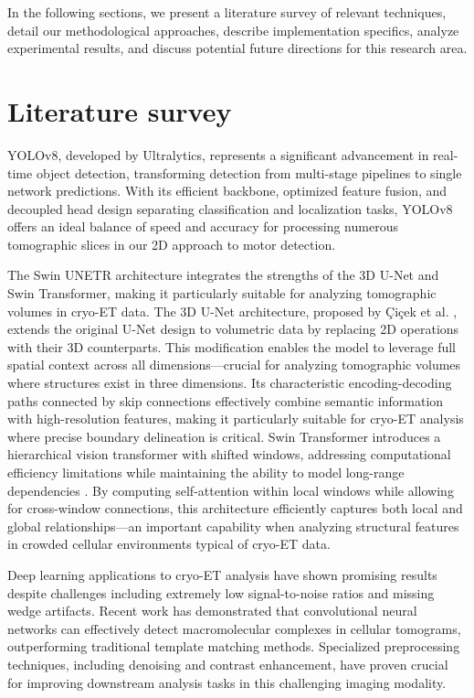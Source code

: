 \documentclass{article}
\begin{document}
In the following sections, we present a literature survey of relevant techniques, detail our methodological approaches, describe implementation specifics, analyze experimental results, and discuss potential future directions for this research area.


\section{Literature survey}
\label{sec:lite}
    YOLOv8, developed by Ultralytics, represents a significant advancement in real-time object detection, transforming detection from multi-stage pipelines to single network predictions\cite{jocherUltralyticsYolov5V702022}. With its efficient backbone, optimized feature fusion, and decoupled head design separating classification and localization tasks, YOLOv8 offers an ideal balance of speed and accuracy for processing numerous tomographic slices in our 2D approach to motor detection\cite{yaseenWhatYOLOv8InDepth2024}.
    
    The Swin UNETR architecture integrates the strengths of the 3D U-Net and Swin Transformer\cite{Hatamizadeh2022SwinUS}, making it particularly suitable for analyzing tomographic volumes in cryo-ET data. The 3D U-Net architecture, proposed by Çiçek et al. \cite{cicek3DUNetLearning2016}, extends the original U-Net design to volumetric data by replacing 2D operations with their 3D counterparts. This modification enables the model to leverage full spatial context across all dimensions—crucial for analyzing tomographic volumes where structures exist in three dimensions. Its characteristic encoding-decoding paths connected by skip connections effectively combine semantic information with high-resolution features, making it particularly suitable for cryo-ET analysis where precise boundary delineation is critical. Swin Transformer introduces a hierarchical vision transformer with shifted windows, addressing computational efficiency limitations while maintaining the ability to model long-range dependencies \cite{liuSwinTransformerHierarchical2021}. By computing self-attention within local windows while allowing for cross-window connections, this architecture efficiently captures both local and global relationships—an important capability when analyzing structural features in crowded cellular environments typical of cryo-ET data.

    Deep learning applications to cryo-ET analysis have shown promising results despite challenges including extremely low signal-to-noise ratios and missing wedge artifacts. Recent work has demonstrated that convolutional neural networks can effectively detect macromolecular complexes in cellular tomograms, outperforming traditional template matching methods\cite{chenConvolutionalNeuralNetworks2017}. Specialized preprocessing techniques, including denoising and contrast enhancement, have proven crucial for improving downstream analysis tasks in this challenging imaging modality.
\end{document}
